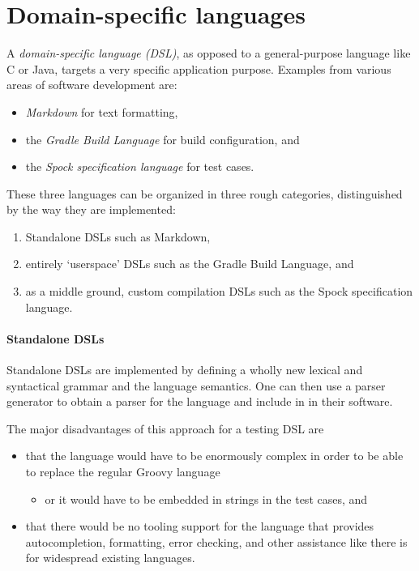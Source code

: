 \section{Domain-specific languages}
A \textit{domain-specific language (DSL)},
as opposed to a general-purpose language like C or Java,
targets a very specific application purpose.
Examples from various areas of software development are:
\begin{itemize}
  \item \textit{Markdown} for text formatting, \autocite{MarkdownIntro}
  \item the \textit{Gradle Build Language} for build configuration, \autocite{GradleWritingBuildScripts} and
  \item the \textit{Spock specification language} for test cases. \autocite{SpockFrameworkDoc}
\end{itemize}

These three languages can be organized in three rough categories,
distinguished by the way they are implemented:
\begin{enumerate}
  \item Standalone DSLs such as Markdown,
  \item entirely `userspace' DSLs such as the Gradle Build Language, and
  \item as a middle ground, custom compilation DSLs such as the Spock specification language.
\end{enumerate}

\paragraph{Standalone DSLs}
Standalone DSLs are implemented by defining a wholly new
lexical and syntactical grammar and the language semantics.
One can then use a parser generator to obtain a parser for the language
and include in in their software.

The major disadvantages of this approach for a testing DSL are
\begin{itemize}
  \item that the language would have to be enormously complex
    in order to be able to replace the regular Groovy language
    \begin{itemize}
      \item or it would have to be embedded in strings in the test cases, and
    \end{itemize}
  \item that there would be no tooling support for the language
    that provides autocompletion, formatting, error checking, and other assistance
    like there is for widespread existing languages.
\end{itemize}

